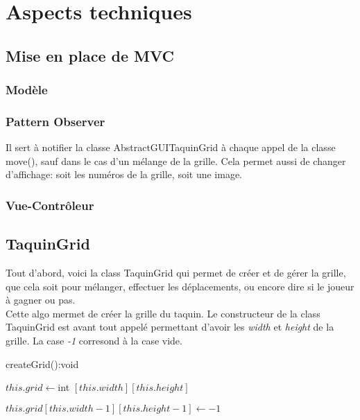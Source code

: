 \chapter{Aspects techniques}

	\section{Mise en place de MVC}

		\subsection{Modèle}



		\subsection{Pattern Observer}
			Il sert à notifier la classe AbstractGUITaquinGrid à chaque appel de la classe move(), sauf dans le cas d'un mélange de la grille. Cela permet aussi de changer d'affichage: soit les numéros de la grille, soit une image.


		\subsection{Vue-Contrôleur}



	\section{TaquinGrid}

		Tout d'abord, voici la class TaquinGrid qui permet de créer et de gérer la grille, que cela soit pour mélanger, effectuer les déplacements, ou encore dire si le joueur à gagner ou pas.
		\\
		Cette algo mermet de créer la grille du taquin. Le constructeur de la class TaquinGrid est avant tout appelé permettant d'avoir les \textit{width} et \textit{height} de la grille. La case \textit{-1} corresond à la case vide.

		\begin{algorithm}[H]
			\caption{createGrid():void}
			$this.grid \leftarrow $int $[this.width][this.height]$


			$this.grid[this.width-1][this.height-1] \leftarrow -1$
		\end{algorithm}

